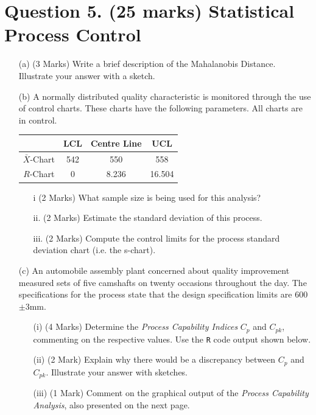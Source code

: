 \documentclass[a4paper,12pt]{article}
\begin{document}
{\newpage

\section*{Question 5. (25 marks) Statistical Process Control }

\begin{itemize}



	\item[(a)] (3 Marks) Write a brief description of the Mahalanobis Distance. Illustrate your answer with a sketch.

\item[(b)] A normally distributed quality characteristic is monitored through the use of control charts. These charts have the following parameters. All charts are in control.
\begin{center}
	\begin{tabular}{|c|c|c|c|}
		\hline  & LCL & Centre Line & UCL \\
		\hline $\bar{X}$-Chart & 542 & 550 & 558 \\
		\hline $R$-Chart & 0 & 8.236 & 16.504 \\ \hline
	\end{tabular}
\end{center}

\begin{itemize}
	\item[i] (2 Marks) What sample size is being used for this analysis?
	\item[ii.] (2 Marks) Estimate the standard deviation of this process.
	\item[iii.] (2 Marks) Compute the control limits for the process standard deviation chart (i.e. the s-chart).
\end{itemize}	


\item[(c)]
An automobile assembly plant concerned about quality improvement measured sets of five camshafts on twenty occasions throughout the day. The specifications for the process state that the design specification limits are 600$\pm$3mm.


\begin{itemize}
	\item[(i)] (4 Marks) Determine the \emph{Process Capability Indices} $C_p$ and $C_{pk}$, commenting on the respective values. Use the \texttt{R} code output shown below.
	\item[(ii)] (2 Mark)  Explain why there would be a discrepancy between $C_p$ and $C_{pk}$. Illustrate your answer with sketches.
	\item[(iii)] (1 Mark) Comment on the graphical output of the \emph{Process Capability Analysis}, also presented on the next page.
\end{itemize}



\end{itemize}}
\end{document}
